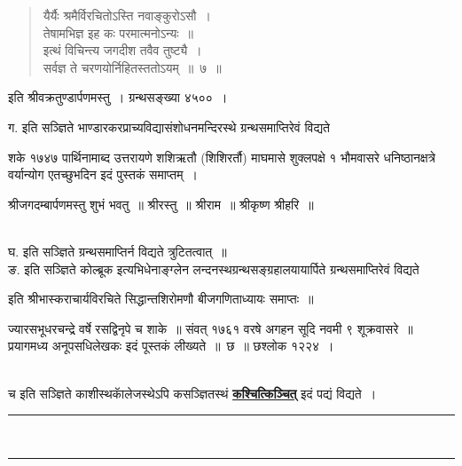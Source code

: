\documentclass[11pt, openany]{book}
\begin{document}
\begin{quote}
    \qt
    यैर्यैः श्रमैर्विरचितोऽस्ति नवाङ्कुरोऽसौ~।\\
 तेषामभिज्ञ इह कः परमात्मनोऽन्यः~॥\\
 इत्थं विचिन्त्य जगदीश तवैव तुष्ट्यै~।\\
 सर्वज्ञ ते चरणयोर्निहितस्ततोऽयम्~॥~७~॥
\end{quote}
\vspace{-2mm}

{\qt इति श्रीवक्रतुण्डार्पणमस्तु~। ग्रन्थसङ्ख्या ४५००~।}\\
\vspace{-2mm}

 ग. इति सञ्ज्ञिते भाण्डारकरप्राच्यविद्यासंशोधनमन्दिरस्थे
ग्रन्थसमाप्तिरेवं विद्यते\textendash \\
\vspace{-4mm}

{\qt शके १७४७ पार्थिनामाब्द उत्तरायणे शशिऋतौ (शिशिरर्तौ) माघमासे शुक्लपक्षे १ भौमवासरे धनिष्ठानक्षत्रे वर्यान्योग एतच्छुभदिन इदं पुस्तकं
समाप्तम्~।\\
\vspace{-4mm}

श्रीजगदम्बार्पणमस्तु शुभं भवतु~॥ श्रीरस्तु~॥ श्रीराम~॥ श्रीकृष्ण श्रीहरि~॥}\\

\vspace{-2mm}
 घ. इति सञ्ज्ञिते ग्रन्थसमाप्तिर्न विद्यते त्रुटितत्वात्~॥\\

\vspace{-2mm}
 ङ. इति सञ्ज्ञिते कोल्ब्रूक इत्यभिधेनाङ्ग्लेन
लन्दनस्थग्रन्थसङ्ग्रहालयायार्पिते
ग्रन्थसमाप्तिरेवं विद्यते\textendash

{\qt इति श्रीभास्कराचार्यविरचिते सिद्धान्तशिरोमणौ बीजगणिताध्यायः समाप्तः~॥\\
\vspace{-4mm}

 ज्यारसभूधरचन्द्रे वर्षे रसद्विनृपे च शाके~॥ संवत् १७६१ वरषे अगहन सूदि
नवमी ९ शूक्रवासरे~॥ प्रयागमध्य अनूपसधिलेखकः इदं पूस्तकं लीख्यते~॥~छ~॥ छश्लोक १२२४~।}\\

\vspace{-2mm}
 च इति सञ्ज्ञिते काशीस्थकाॅलेजस्थेऽपि कसञ्ज्ञितस्थं \hyperref[End8]{\textbf{कश्चित्किञ्चित्}}
इदं पद्यं विद्यते~।

\vspace{5mm}
\begin{center}
    \rule{0.3\linewidth}{0.5pt}\\
\vspace{-5mm}
    \rule{0.3\linewidth}{0.5pt}
\end{center}

 
\end{document}

